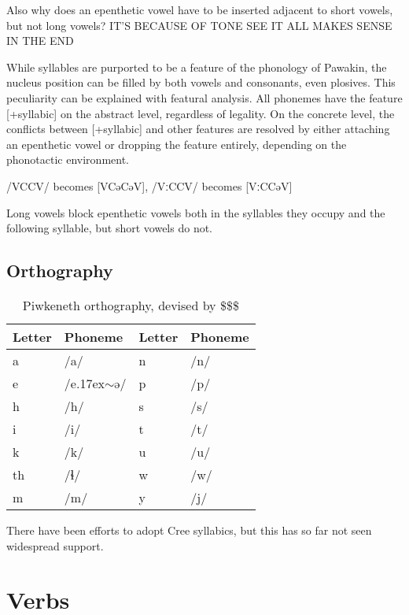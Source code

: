 \documentclass[smallroyalvopaper,9pt]{memoir} %
\newcommand{\lang}{Piwkeneth}
\newcommand{\langeng}{Pawakin}
\newcommand{\longv}[1]{#1ː}
\newcommand{\ttilde}{\raise.17ex\hbox{$\scriptstyle\sim$}}
\begin{document}
Also why does an epenthetic vowel have to be inserted adjacent to short vowels, but not long vowels? IT'S BECAUSE OF TONE SEE IT ALL MAKES SENSE IN THE END

While syllables are purported to be a feature of the phonology of \langeng{}, the nucleus position can be filled by both vowels and consonants, even plosives. This peculiarity can be explained with featural analysis. All phonemes have the feature [+syllabic] on the abstract level, regardless of legality. On the concrete level, the conflicts between [+syllabic] and other features are resolved by either attaching an epenthetic vowel or dropping the feature entirely, depending on the phonotactic environment. 

/VCCV/ becomes [VCəCəV], /\longv{V}CCV/ becomes [\longv{V}CCəV]

Long vowels block epenthetic vowels both in the syllables they occupy and the following syllable, but short vowels do not. 

\newpage

\section{Orthography}

\begin{table}[ht]
    \centering
    \begin{tabular}{llll}
        \toprule
        Letter & Phoneme & Letter & Phoneme\\
        \midrule
        a & /a/ & n & /n/ \\
        e & /e\ttilde{}ə/ & p & /p/ \\
        h & /h/ & s & /s/ \\
        i & /i/ & t & /t/ \\
        k & /k/ & u & /u/ \\
        th& /ɬ/ & w & /w/ \\
        m & /m/ & y & /j/ \\
        \bottomrule
    \end{tabular}
    \caption{\lang{} orthography, devised by \$\$\$}
\end{table}

There have been efforts to adopt Cree syllabics, but this has so far not seen widespread support.

\chapter{Verbs} 
\end{document}
